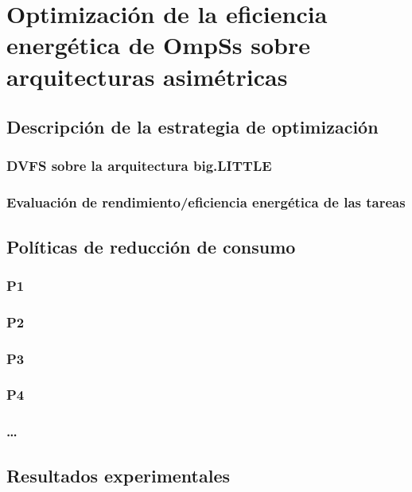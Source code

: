\cleardoublepage

\chapter{Optimización de la eficiencia energética de OmpSs sobre arquitecturas asimétricas}
\label{ch:chapter5}

\section{Descripción de la estrategia de optimización}

\subsection{DVFS sobre la arquitectura big.LITTLE}

\subsection{Evaluación de rendimiento/eficiencia energética de las tareas}

\section{Políticas de reducción de consumo}

\subsection{P1}

\subsection{P2}

\subsection{P3}

\subsection{P4}

\subsection{\ldots}

\section{Resultados experimentales}
